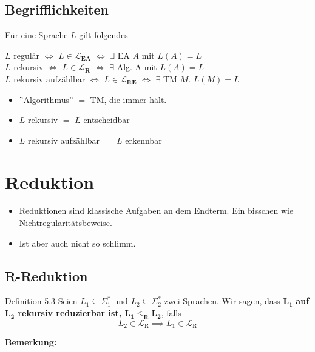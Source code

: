 \documentclass[a4paper, 11pt]{article}
\def\Lr{\mathcal{L}_\text{R}}
\begin{document}
            
            
                \subsection{Begrifflichkeiten}

                Für eine Sprache $L$ gilt folgendes
                \begin{center}
                    $L$ regulär $\iff $ $L \in \mathbf{\mathcal{L}_{\textbf{EA}}}$ $\iff$ $\exists$ EA $A$ mit $L(A) = L$\\
                    $L$ rekursiv $\iff$ $L \in \mathbf{\mathcal{L}_{\textbf{R}}}$ $\iff$ $\exists$ Alg. A mit $L(A) = L$\\
                    $L$ rekursiv aufzählbar $\iff$ $L \in \mathbf{\mathcal{L}_{\textbf{RE}}}$ $\iff$ $\exists$ TM $M$. $L(M) = L$
                \end{center}
                \begin{itemize}
                    \item  ''Algorithmus'' $=$ TM, die immer hält.
                    \item $L$ rekursiv $=$ $L$ entscheidbar
                    \item $L$ rekursiv aufzählbar $=$ $L$ erkennbar
                \end{itemize}
               
            
            
            
            
            \section{Reduktion}
            
                \begin{itemize}
                    \item Reduktionen sind klassische Aufgaben an dem Endterm. Ein bisschen wie Nichtregularitätsbeweise.
                    \item Ist aber auch nicht so schlimm.
                \end{itemize}
            
            
            
                \subsection{R-Reduktion}
                \begin{mainbox}{Definition 5.3}
                    Seien $L_1 \subseteq \Sigma_{1}^*$ und $L_2 \subseteq \Sigma_{2}^*$ zwei Sprachen. Wir sagen, dass $\mathbf{L_1}$ \textbf{auf $\mathbf{L_2}$ rekursiv reduzierbar ist, $\mathbf{L_1 \leq_{\textbf{R}} L_2}$}, falls
                    $$L_2 \in \Lr \implies L_1 \in \Lr$$
                \end{mainbox}
                \textbf{Bemerkung:}
            
\end{document}
